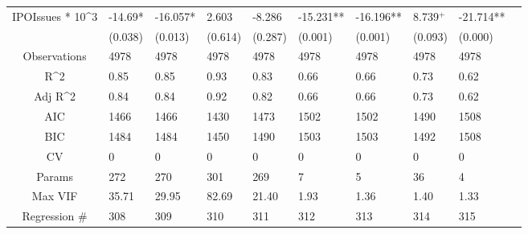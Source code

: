 \documentclass{article}
\begin{document}
\begin{table}[H]
\begin{tabular}{|clllllllll|}
  IPOIssues * 10^3 & -14.69* & -16.057* & 2.603 & -8.286 & -15.231** & -16.196** & 8.739$^{+}$ & -21.714** & \\ 
   & (0.038) & (0.013) & (0.614) & (0.287) & (0.001) & (0.001) & (0.093) & (0.000) & \\ 
  \hline 
 Observations & 4978 & 4978 & 4978 & 4978 & 4978 & 4978 & 4978 & 4978 & \\ 
  R^2 & 0.85 & 0.85 & 0.93 & 0.83 & 0.66 & 0.66 & 0.73 & 0.62 & \\ 
  Adj R^2 & 0.84 & 0.84 & 0.92 & 0.82 & 0.66 & 0.66 & 0.73 & 0.62 & \\ 
  AIC & 1466 & 1466 & 1430 & 1473 & 1502 & 1502 & 1490 & 1508 & \\ 
  BIC & 1484 & 1484 & 1450 & 1490 & 1503 & 1503 & 1492 & 1508 & \\ 
  CV & 0 & 0 & 0 & 0 & 0 & 0 & 0 & 0 & \\ 
  Params & 272 & 270 & 301 & 269 & 7 & 5 & 36 & 4 & \\ 
  Max VIF & 35.71 & 29.95 & 82.69 & 21.40 & 1.93 & 1.36 & 1.40 & 1.33 & \\ 
  Regression \# & 308 & 309 & 310 & 311 & 312 & 313 & 314 & 315 & \\ 
   \hline
\end{tabular}
 
\end{table}
\end{document}
